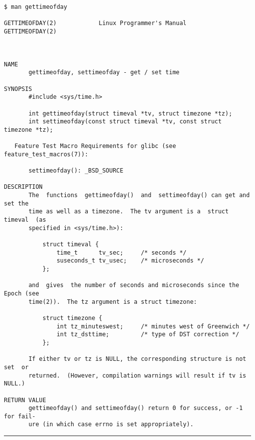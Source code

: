 \begin{verbatim}
$ man gettimeofday

GETTIMEOFDAY(2)            Linux Programmer's Manual           GETTIMEOFDAY(2)



NAME
       gettimeofday, settimeofday - get / set time

SYNOPSIS
       #include <sys/time.h>

       int gettimeofday(struct timeval *tv, struct timezone *tz);
       int settimeofday(const struct timeval *tv, const struct timezone *tz);

   Feature Test Macro Requirements for glibc (see feature_test_macros(7)):

       settimeofday(): _BSD_SOURCE

DESCRIPTION
       The  functions  gettimeofday()  and  settimeofday() can get and set the
       time as well as a timezone.  The tv argument is a  struct  timeval  (as
       specified in <sys/time.h>):

           struct timeval {
               time_t      tv_sec;     /* seconds */
               suseconds_t tv_usec;    /* microseconds */
           };

       and  gives  the number of seconds and microseconds since the Epoch (see
       time(2)).  The tz argument is a struct timezone:

           struct timezone {
               int tz_minuteswest;     /* minutes west of Greenwich */
               int tz_dsttime;         /* type of DST correction */
           };

       If either tv or tz is NULL, the corresponding structure is not  set  or
       returned.  (However, compilation warnings will result if tv is NULL.)

RETURN VALUE
       gettimeofday() and settimeofday() return 0 for success, or -1 for fail‐
       ure (in which case errno is set appropriately).
\end{verbatim}
\begin{center}\rule{3in}{0.4pt}\end{center}
